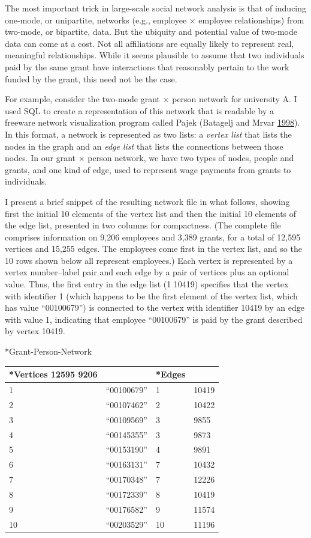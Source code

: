 \documentclass[]{krantz}
\begin{document}
The most important trick in large-scale social network analysis is that
of inducing one-mode, or unipartite, networks (e.g., employee \(\times\)
employee relationships) from two-mode, or bipartite, data. But the
ubiquity and potential value of two-mode data can come at a cost. Not
all affiliations are equally likely to represent real, meaningful
relationships. While it seems plausible to assume that two individuals
paid by the same grant have interactions that reasonably pertain to the
work funded by the grant, this need not be the case.

For example, consider the two-mode grant \(\times\) person network for
university A. I used SQL to create a representation of this network that
is readable by a freeware network visualization program called Pajek
(Batagelj and Mrvar \protect\hyperlink{ref-batagelj1998pajek}{1998}). In
this format, a network is represented as two lists: a \emph{vertex list}
that lists the nodes in the graph and an \emph{edge list} that lists the
connections between those nodes. In our grant \(\times\) person network,
we have two types of nodes, people and grants, and one kind of edge,
used to represent wage payments from grants to individuals.

I present a brief snippet of the resulting network file in what follows,
showing first the initial 10 elements of the vertex list and then the
initial 10 elements of the edge list, presented in two columns for
compactness. (The complete file comprises information on 9,206 employees
and 3,389 grants, for a total of 12,595 vertices and 15,255 edges. The
employees come first in the vertex list, and so the 10 rows shown below
all represent employees.) Each vertex is represented by a vertex
number--label pair and each edge by a pair of vertices plus an optional
value. Thus, the first entry in the edge list (1 10419) specifies that
the vertex with identifier 1 (which happens to be the first element of
the vertex list, which has value ``00100679'') is connected to the
vertex with identifier 10419 by an edge with value 1, indicating that
employee ``00100679'' is paid by the grant described by vertex 10419.

*Grant-Person-Network

\begin{longtable}[]{@{}llll@{}}
\toprule
*Vertices 12595 9206 & & *Edges &\tabularnewline
\midrule
\endhead
1 & ``00100679'' & 1 & 10419\tabularnewline
2 & ``00107462'' & 2 & 10422\tabularnewline
3 & ``00109569'' & 3 & 9855\tabularnewline
4 & ``00145355'' & 3 & 9873\tabularnewline
5 & ``00153190'' & 4 & 9891\tabularnewline
6 & ``00163131'' & 7 & 10432\tabularnewline
7 & ``00170348'' & 7 & 12226\tabularnewline
8 & ``00172339'' & 8 & 10419\tabularnewline
9 & ``00176582'' & 9 & 11574\tabularnewline
10 & ``00203529'' & 10 & 11196\tabularnewline
\bottomrule
\end{longtable}
\end{document}
